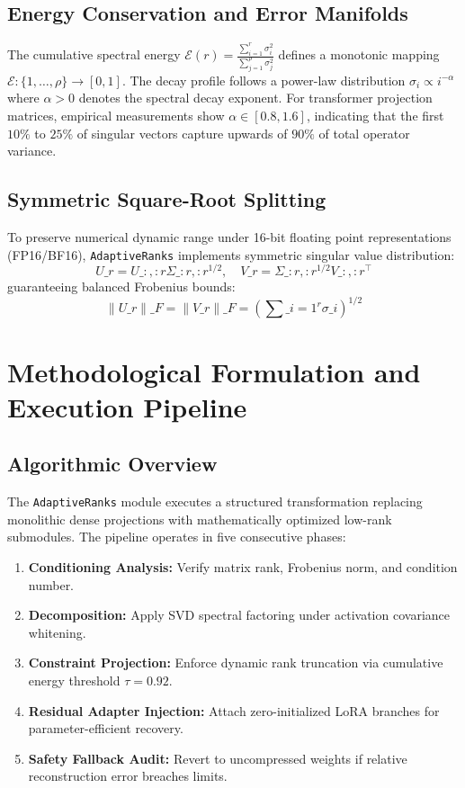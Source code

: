 \subsection{Energy Conservation and Error Manifolds}
The cumulative spectral energy $\mathcal{E}(r) = \frac{\sum_{i=1}^r \sigma_i^2}{\sum_{j=1}^\rho \sigma_j^2}$ defines a monotonic mapping $\mathcal{E}: \{1, \dots, \rho\} \to [0, 1]$. The decay profile follows a power-law distribution $\sigma_i \propto i^{-\alpha}$ where $\alpha > 0$ denotes the spectral decay exponent. For transformer projection matrices, empirical measurements show $\alpha \in [0.8, 1.6]$, indicating that the first $10\%$ to $25\%$ of singular vectors capture upwards of $90\%$ of total operator variance.

\subsection{Symmetric Square-Root Splitting}
To preserve numerical dynamic range under 16-bit floating point representations (FP16/BF16), \texttt{AdaptiveRanks} implements symmetric singular value distribution:
\[
U\_r = U\_{:, :r} \Sigma\_{:r, :r}^{1/2}, \quad V\_r = \Sigma\_{:r, :r}^{1/2} V\_{:, :r}^\top
\]
guaranteeing balanced Frobenius bounds:
\[
\|U\_r\|\_F = \|V\_r\|\_F = \left( \sum\_{i=1}^{r} \sigma\_i \right)^{1/2}
\]


\section{Methodological Formulation and Execution Pipeline}

\subsection{Algorithmic Overview}
The \texttt{AdaptiveRanks} module executes a structured transformation replacing monolithic dense projections with mathematically optimized low-rank submodules. The pipeline operates in five consecutive phases:
\begin{enumerate}
  \item \textbf{Conditioning Analysis:} Verify matrix rank, Frobenius norm, and condition number.
  \item \textbf{Decomposition:} Apply SVD spectral factoring under activation covariance whitening.
  \item \textbf{Constraint Projection:} Enforce dynamic rank truncation via cumulative energy threshold $\tau = 0.92$.
  \item \textbf{Residual Adapter Injection:} Attach zero-initialized LoRA branches for parameter-efficient recovery.
  \item \textbf{Safety Fallback Audit:} Revert to uncompressed weights if relative reconstruction error breaches limits.
\end{enumerate}

